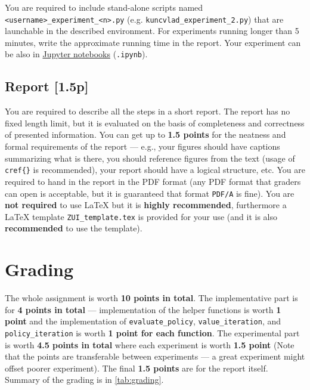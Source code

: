 \documentclass[10pt,journal,compsoc,twoside]{IEEEtran}
\begin{document}
You are required to include stand-alone scripts named \texttt{<username>\_experiment\_<n>.py} (e.g. \texttt{kuncvlad\_experiment\_2.py}) that are launchable in the described environment. For experiments running longer than 5 minutes, write the approximate running time in the report. Your experiment can be also in \href{http://jupyter.org/}{Jupyter notebooks} (\texttt{.ipynb}).


\subsection{Report [1.5p]}
You are required to describe all the steps in a short report. The report has no fixed length limit, but it is evaluated on the basis of completeness and correctness of presented information. You can get up to \textbf{1.5 points} for the neatness and formal requirements of the report --- e.g., your figures should have captions summarizing what is there, you should reference figures from the text (usage of \texttt{\\cref\{\}} is recommended), your report should have a logical structure, etc. You are required to hand in the report in the PDF format (any PDF format that graders can open is acceptable, but it is guaranteed that format \texttt{PDF/A} is fine). You are \textbf{not required} to use \LaTeX{}  but it is \textbf{highly recommended}, furthermore a \LaTeX{} template \texttt{ZUI\_template.tex} is provided for your use (and it is also \textbf{recommended} to use the template).

\section{Grading}
The whole assignment is worth \textbf{10 points in total}. The implementative part is for \textbf{4 points in total} --- implementation of the helper functions is worth \textbf{1 point} and the implementation of \lstinline{evaluate_policy}, \lstinline{value_iteration}, and \lstinline{policy_iteration} is worth \textbf{1 point for each function}. The experimental part is worth \textbf{4.5 points in total} where each experiment is worth \textbf{1.5 point} (Note that the points are transferable between experiments --- a great experiment might offset poorer experiment). The final \textbf{1.5 points} are for the report itself. Summary of the grading is in \cref{tab:grading}.
\end{document}
